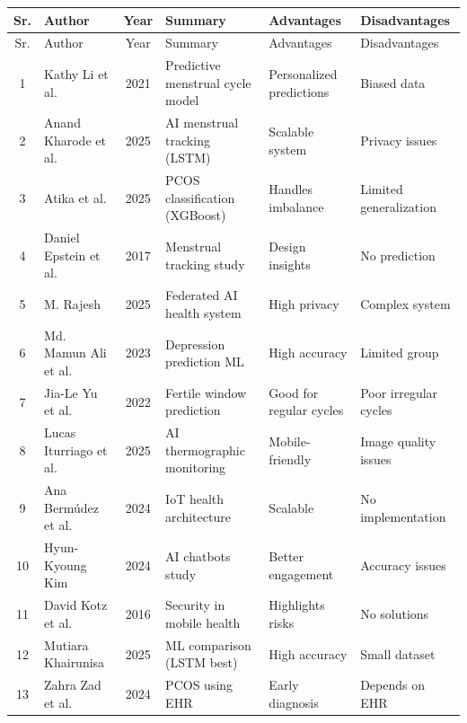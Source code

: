 \begin{center}
\small
\setlength{\tabcolsep}{6pt}
\renewcommand{\arraystretch}{1.2}

\begin{longtable}{|c|p{3cm}|c|p{3.5cm}|p{3cm}|p{3cm}|}
\hline
Sr. & Author & Year & Summary & Advantages & Disadvantages \\
\hline
\endfirsthead

\hline
Sr. & Author & Year & Summary & Advantages & Disadvantages \\
\hline
\endhead

1 & Kathy Li et al. \cite{li2021} & 2021 & Predictive menstrual cycle model & Personalized predictions & Biased data \\
2 & Anand Kharode et al. \cite{soni2025} & 2025 & AI menstrual tracking (LSTM) & Scalable system & Privacy issues \\
3 & Atika et al. \cite{ahmed2023} & 2025 & PCOS classification (XGBoost) & Handles imbalance & Limited generalization \\
4 & Daniel Epstein et al. \cite{epstein2017} & 2017 & Menstrual tracking study & Design insights & No prediction \\
5 & M. Rajesh \cite{rajesh2025} & 2025 & Federated AI health system & High privacy & Complex system \\
6 & Md. Mamun Ali et al. \cite{ali2023} & 2023 & Depression prediction ML & High accuracy & Limited group \\
7 & Jia-Le Yu et al. \cite{yu2022} & 2022 & Fertile window prediction & Good for regular cycles & Poor irregular cycles \\
8 & Lucas Iturriago et al. \cite{iturriago2025} & 2025 & AI thermographic monitoring & Mobile-friendly & Image quality issues \\
9 & Ana Berm\'{u}dez et al. \cite{kilungeja2025} & 2024 & IoT health architecture & Scalable & No implementation \\
10 & Hyun-Kyoung Kim \cite{kim2024} & 2024 & AI chatbots study & Better engagement & Accuracy issues \\
11 & David Kotz et al. \cite{kotz2016} & 2016 & Security in mobile health & Highlights risks & No solutions \\
12 & Mutiara Khairunisa \cite{khairunisa2025} & 2025 & ML comparison (LSTM best) & High accuracy & Small dataset \\
13 & Zahra Zad et al. \cite{zad2024} & 2024 & PCOS using EHR & Early diagnosis & Depends on EHR \\

\end{longtable}
\end{center}
